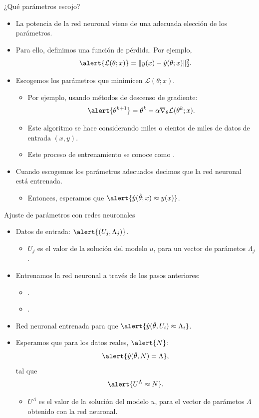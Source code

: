 \documentclass[
  unknownkeysallowed %
]{beamer}
\begin{document}
\begin{frame}{¿Qué parámetros escojo?}
  \begin{itemize}
    \item La potencia de la red neuronal viene de una adecuada elección de los parámetros.
    \item Para ello, definimos una función de pérdida. Por ejemplo,
    $$
    \alert{\mathcal{L}(\theta;x)}=\|y(x)-\hat y(\theta;x)\|_2^2.
    $$
    \item Escogemos los parámetros que minimicen $\mathcal{L}(\theta;x)$.
    \begin{itemize}
      \item Por ejemplo, usando métodos de descenso de gradiente:
      $$
        \alert{\theta^{k+1}} = \theta^k - \alpha\nabla_\theta \mathcal{L}(\theta^k;x).
      $$
      \item Este algoritmo se hace considerando miles o cientos de miles de datos de entrada $(x,y)$.
      \item Este proceso de entrenamiento se conoce como .
    \end{itemize}
    \item Cuando escogemos los parámetros adecuados decimos que la red neuronal está entrenada.
    \begin{itemize}
      \item Entonces, esperamos que $\alert{\hat y(\hat \theta;x)\approx y(x)}$.
    \end{itemize}
  \end{itemize}
\end{frame}

\begin{frame}{Ajuste de parámetros con redes neuronales}
  \begin{itemize}
    \item Datos de entrada: $\alert{(U_j,\Lambda_j)}$.
    \begin{itemize}
      \item $U_j$ es el valor de la solución del modelo $u$, para un vector de parámetos $\Lambda_j$.
    \end{itemize}
    \item Entrenamos la red neuronal a través de los pasos anteriores:
    \begin{itemize}
      \item {}.
      \item {}.
    \end{itemize}
    \item Red neuronal entrenada para que $\alert{\hat y(\hat \theta,U_i)\approx \Lambda_i}$.
    \item Esperamos que para los datos reales, $\alert{N}$:
    $$
    \alert{\hat y(\hat \theta,N)= \Lambda},
    $$
    tal que
    $$
    \alert{U^\Lambda\approx N}.
    $$
    \begin{itemize}
      \item $U^\Lambda$ es el valor de la solución del modelo $u$, para el vector de parámetos $\Lambda$ obtenido con la red neuronal.
    \end{itemize}
  \end{itemize}
\end{frame}
\end{document}
